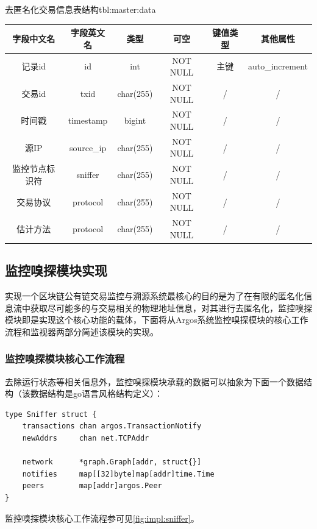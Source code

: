\documentclass[supercite]{HustGraduPaper}
\newcommand{\rfig}[1]{\autoref{fig:#1}}
\theoremstyle{definition}
\begin{document}
\begin{generaltab}{去匿名化交易信息表结构}{tbl:master:data}
  \begin{tabular}{c|ccccc}
    \toprule
    字段中文名          & 字段英文名 & 类型       & 可空      & 键值类型 & 其他属性\\
    \midrule
    记录id& id&	int	&NOT NULL &	主键	&	auto\_{}increment \\
    交易id& txid&	char(255)&	NOT NULL & /		&/\\
    时间戳& timestamp&	bigint&	NOT NULL &	/		&/\\
    源IP& source\_{}ip&	char(255)&	NOT NULL &		/		&/\\	
    监控节点标识符&sniffer&	char(255)&	NOT NULL &			/		&/\\
    交易协议& protocol & 	char(255)&	NOT NULL &			/		&/\\
    估计方法& protocol & 	char(255)&	NOT NULL &			/		&/\\
    \bottomrule
  \end{tabular}
\end{generaltab}

\subsection{监控嗅探模块实现}
实现一个区块链公有链交易监控与溯源系统最核心的目的是为了在有限的匿名化信息流中获取尽可能多的与交易相关的物理地址信息，对其进行去匿名化，监控嗅探模块即是实现这个核心功能的载体，下面将从Argos系统监控嗅探模块的核心工作流程和监视器两部分简述该模块的实现。
\subsubsection{监控嗅探模块核心工作流程}
去除运行状态等相关信息外，监控嗅探模块承载的数据可以抽象为下面一个数据结构（该数据结构是go语言风格结构定义）：

\begin{verbatim}
type Sniffer struct {
    transactions chan argos.TransactionNotify
    newAddrs     chan net.TCPAddr

    network      *graph.Graph[addr, struct{}]
    notifies     map[[32]byte]map[addr]time.Time
    peers        map[addr]argos.Peer
}
\end{verbatim}

监控嗅探模块核心工作流程参可见\rfig{impl:sniffer}。
\end{document}
